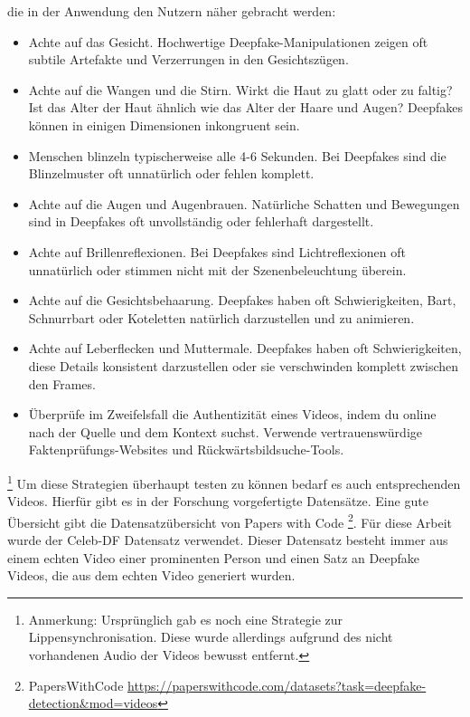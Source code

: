 die in der Anwendung den Nutzern näher gebracht werden:
\begin{itemize}
    \item Achte auf das Gesicht. Hochwertige Deepfake-Manipulationen zeigen oft subtile Artefakte und Verzerrungen in den Gesichtszügen.
    \item Achte auf die Wangen und die Stirn. Wirkt die Haut zu glatt oder zu faltig? 
        Ist das Alter der Haut ähnlich wie das Alter der Haare und Augen? Deepfakes können in einigen Dimensionen inkongruent sein.
    \item Menschen blinzeln typischerweise alle 4-6 Sekunden. Bei Deepfakes sind die Blinzelmuster oft unnatürlich oder fehlen komplett.
    \item Achte auf die Augen und Augenbrauen. Natürliche Schatten und Bewegungen sind in Deepfakes oft unvollständig oder fehlerhaft dargestellt.
    \item Achte auf Brillenreflexionen. Bei Deepfakes sind Lichtreflexionen oft unnatürlich oder stimmen nicht mit der Szenenbeleuchtung überein.
    \item Achte auf die Gesichtsbehaarung. Deepfakes haben oft Schwierigkeiten, Bart, Schnurrbart oder Koteletten natürlich darzustellen und zu animieren.
    \item Achte auf Leberflecken und Muttermale. Deepfakes haben oft Schwierigkeiten, diese Details konsistent darzustellen oder sie verschwinden komplett zwischen den Frames.
    \item Überprüfe im Zweifelsfall die Authentizität eines Videos, 
        indem du online nach der Quelle und dem Kontext suchst. Verwende vertrauenswürdige Faktenprüfungs-Websites und Rückwärtsbildsuche-Tools.
\end{itemize}
\footnote{Anmerkung: Ursprünglich gab es noch eine Strategie zur Lippensynchronisation. 
Diese wurde allerdings aufgrund des nicht vorhandenen Audio der Videos bewusst entfernt.}
Um diese Strategien überhaupt testen zu können bedarf es auch entsprechenden Videos. 
Hierfür gibt es in der Forschung vorgefertigte Datensätze. 
Eine gute Übersicht gibt die Datensatzübersicht von Papers with Code \footnote{
    PapersWithCode
    \url{https://paperswithcode.com/datasets?task=deepfake-detection&mod=videos}
}. 
Für diese Arbeit wurde der Celeb-DF Datensatz \cite{yuezunliCelebDFLargescaleChallenging2020} verwendet. 
Dieser Datensatz besteht immer aus einem echten Video einer prominenten Person und einen Satz an Deepfake Videos, die aus dem echten Video generiert wurden.

